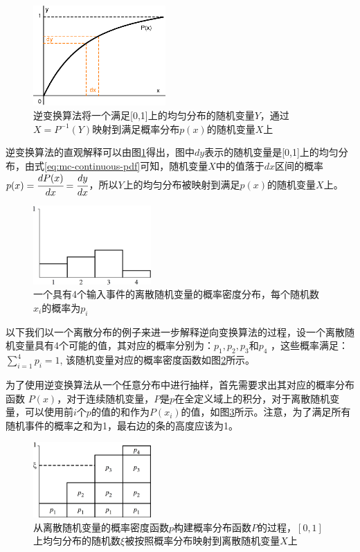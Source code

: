 \begin{figure}
	\sidecaption
	\includegraphics[width=0.45\textwidth]{figures/mc/inversion-method}
	\caption{逆变换算法将一个满足[0,1]上的均匀分布的随机变量$Y$，通过$X=P^{-1}(Y)$映射到满足概率分布$p(x)$的随机变量$X$上}
	\label{f:mc-inversion-method}
\end{figure}

逆变换算法的直观解释可以由图\ref{f:mc-inversion-method}得出，图中$dy$表示的随机变量是[0,1]上的均匀分布，由式\ref{eq:mc-continuous-pdf}可知，随机变量$X$中的值落于$dx$区间的概率$p(x)= \cfrac{dP(x)}{dx}= \cfrac{dy}{dx}$，所以$Y$上的均匀分布被映射到满足$p(x)$的随机变量$X$上。

\begin{figure}
\sidecaption
	\includegraphics[width=0.4\textwidth]{figures/mc/mc-3}
	\caption{一个具有4个输入事件的离散随机变量的概率密度分布，每个随机数$x_i$的概率为$p_i$}
	\label{f:simple-pdf}
\end{figure}

以下我们以一个离散分布的例子来进一步解释逆向变换算法的过程，设一个离散随机变量具有4个可能的值，其对应的概率分别为：$p_1,p_2,p_3$和$p_4$ ，这些概率满足：$\sum_{i=1}^{4}p_i=1$, 该随机变量对应的概率密度函数如图\ref{f:simple-pdf}所示。

为了使用逆变换算法从一个任意分布中进行抽样，首先需要求出其对应的概率分布函数
$P(x)$，对于连续随机变量，$P$是$p$在全定义域上的积分，对于离散随机变量，可以使用前$i$个$p$的值的和作为$P(x_i)$的值，如图\ref{f:mc-discrete-cdf}所示。注意，为了满足所有随机事件的概率之和为1，最右边的条的高度应该为1。

\begin{figure}
\sidecaption
	\includegraphics[width=0.4\textwidth]{figures/mc/mc-4}
	\caption{从离散随机变量的概率密度函数$p$构建概率分布函数$P$的过程，$[0,1]$上均匀分布的随机数$\xi$被按照概率分布映射到离散随机变量$X$上}
	\label{f:mc-discrete-cdf}
\end{figure}

